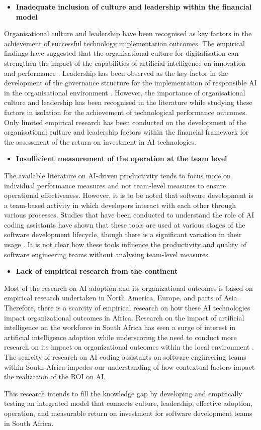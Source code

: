 \begin{itemize}
	\item \textbf{Inadequate inclusion of culture and leadership within the financial model} 
\end{itemize}
Organisational culture and leadership have been recognised as key factors in the achievement of successful technology implementation outcomes. The empirical findings have suggested that the organisational culture for digitalisation can strengthen the impact of the capabilities of artificial intelligence on innovation and performance \autocite{An2024}. Leadership has been observed as the key factor in the development of the governance structure for the implementation of responsible AI in the organisational environment \autocite{Schneider2023}. However, the importance of organisational culture and leadership has been recognised in the literature while studying these factors in isolation for the achievement of technological performance outcomes. Only limited empirical research has been conducted on the development of the organisational culture and leadership factors within the financial framework for the assessment of the return on investment in AI technologies.

\begin{itemize}
	\item \textbf{Insufficient measurement of the operation at the team level} 
\end{itemize}
The available literature on AI-driven productivity tends to focus more on individual performance measures and not team-level measures to ensure operational effectiveness. However, it is to be noted that software development is a team-based activity in which developers interact with each other through various processes. Studies that have been conducted to understand the role of AI coding assistants have shown that these tools are used at various stages of the software development lifecycle, though there is a significant variation in their usage \autocite{Sergeyuk2025}. It is not clear how these tools influence the productivity and quality of software engineering teams without analysing team-level measures.

\begin{itemize}
	\item \textbf{Lack of empirical research from the continent} 
\end{itemize}
Most of the research on AI adoption and its organizational outcomes is based on empirical research undertaken in North America, Europe, and parts of Asia. Therefore, there is a scarcity of empirical research on how these AI technologies impact organizational outcomes in Africa. Research on the impact of artificial intelligence on the workforce in South Africa has seen a surge of interest in artificial intelligence adoption while underscoring the need to conduct more research on its impact on organizational outcomes within the local environment \autocite{Poisat2024}. The scarcity of research on AI coding assistants on software engineering teams within South Africa impedes our understanding of how contextual factors impact the realization of the ROI on AI.

This research intends to fill the knowledge gap by developing and empirically testing an integrated model that connects culture, leadership, effective adoption, operation, and measurable return on investment for software development teams in South Africa.